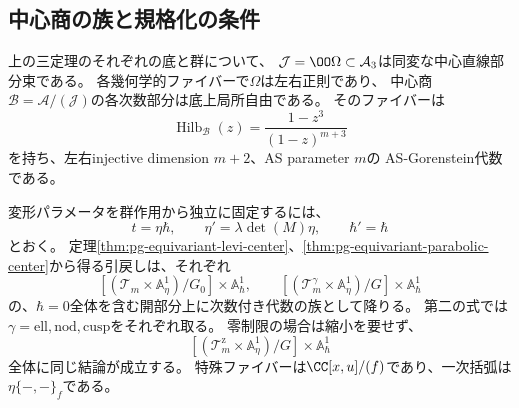 \subsection{中心商の族と規格化の条件}

\begin{corollary}[同変な正則中心商族]
\label{cor:pg-equivariant-central-quotient}
上の三定理のそれぞれの底と群について、
$\mathcal J=\OO\Omega\subset\mathcal A_3$は同変な中心直線部分束である。
各幾何学的ファイバーで$\Omega$は左右正則であり、
中心商$\mathcal B=\mathcal A/(\mathcal J)$の各次数部分は底上局所自由である。
そのファイバーは
\begin{equation}
 \operatorname{Hilb}_{\mathcal B}(z)
 =\frac{1-z^3}{(1-z)^{m+3}}
 \label{eq:pg-equivariant-quotient-hilbert}
\end{equation}
を持ち、左右injective dimension $m+2$、AS parameter $m$の
AS-Gorenstein代数である。

変形パラメータを群作用から独立に固定するには、
\begin{equation}
 t=\eta\hbar,\qquad
 \eta'=\lambda\det(M)\eta,\qquad \hbar'=\hbar
 \label{eq:pg-equivariant-fixed-parameter}
\end{equation}
とおく。
定理\ref{thm:pg-equivariant-levi-center}、\ref{thm:pg-equivariant-parabolic-center}から得る引戻しは、それぞれ
\begin{equation}
 \left[(\mathcal T_m\times\mathbb A^1_\eta)/G_0\right]
       \times\mathbb A^1_\hbar,
 \qquad
 \left[(\mathcal T_m^\gamma\times\mathbb A^1_\eta)/G\right]
       \times\mathbb A^1_\hbar
 \label{eq:pg-equivariant-quotient-stacks}
\end{equation}
の、$\hbar=0$全体を含む開部分上に次数付き代数の族として降りる。
第二の式では$\gamma=\mathrm{ell},\mathrm{nod},\mathrm{cusp}$をそれぞれ取る。
零制限の場合は縮小を要せず、
\begin{equation}
 \left[(\mathcal T_m^{\mathrm z}\times\mathbb A^1_\eta)/G\right]
       \times\mathbb A^1_\hbar
 \label{eq:pg-equivariant-zero-quotient-stack}
\end{equation}
全体に同じ結論が成立する。
特殊ファイバーは$\CC[x,u]/(f)$であり、一次括弧は
$\eta\{-,-\}_f$である。
\end{corollary}
